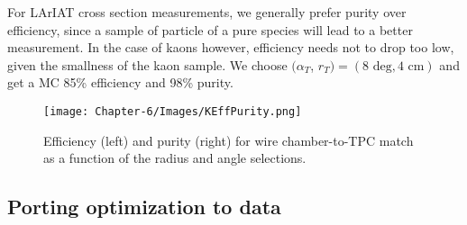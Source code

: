 For LArIAT cross section measurements, we generally prefer purity over efficiency, since a sample of particle of a pure species will lead to a better measurement. In the case of kaons however, efficiency needs not to drop too low, given the smallness of the kaon sample. We choose $(\alpha_{T}$, $r_{T}) = (8 \text{ deg}, 4 \text{ cm} )$ and get a MC 85\% efficiency and 98\% purity.


\begin{figure}[hpbt]
\centering
\texttt{[image: Chapter-6/Images/KEffPurity.png]}
\caption{Efficiency (left) and purity (right) for wire chamber-to-TPC match as a function of the radius and angle selections.}
\label{fig:EffPurityK}
\end{figure}

\subsection{Porting optimization to data}
